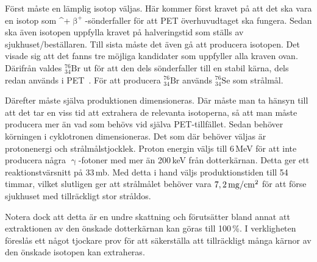 \documentclass[11pt,a4paper, german, english, swedish
]{article}
\newcommand{\BP}{\ifmmode\upbeta^{+}\else$\upbeta^{\!+}$\fi}
\newcommand{\G}{\ifmmode\upgamma\else$\upgamma$\fi}
\begin{document}
Först måste en lämplig isotop väljas. Här kommer först kravet på att det ska vara en isotop som \BP-sönderfaller för att PET överhuvudtaget ska fungera. Sedan ska även isotopen uppfylla kravet på halveringstid som ställs av sjukhuset/beställaren. Till sista måste det även gå att producera isotopen. Det visade sig att det fanns tre möjliga kandidater som uppfyller alla kraven ovan. Därifrån valdes $^{76}_{34}\mathrm{Br}$ ut för att den dels sönderfaller till en stabil kärna, dels redan används i PET~\cite{Lapi_PET,Valette_etal1993,Lovqvist_etal1997,Ribeiro_etal1999}. För att producera $^{76}_{34}\mathrm{Br}$ används $^{76}_{34}\mathrm{Se}$ som strålmål.

Därefter måste själva produktionen dimensioneras. Där måste man ta hänsyn till att det tar en viss tid att extrahera de relevanta isotoperna, så att man måste producera mer än vad som behövs vid själva PET-tillfället. Sedan behöver körningen i cyklotronen dimensioneras. Det som där behöver väljas är protonenergi och strålmålstjocklek. Proton energin väljs till 6\,MeV för att inte producera några \G-fotoner med mer än 200\,keV från dotterkärnan. Detta ger ett reaktionstvärsnitt på 33\,mb. Med detta i hand väljs produktionstiden till 54\,timmar, vilket slutligen ger att strålmålet behöver vara $\unit[7,2]{mg/cm^2}$ för att förse sjukhuset med tillräckligt stor stråldos. 

Notera dock att detta är en undre skattning och förutsätter bland annat att extraktionen av den önskade dotterkärnan kan göras till 100\,\%. I verkligheten föreslås ett något tjockare prov för att säkerställa att tillräckligt många kärnor av den önskade isotopen kan extraheras. 






\end{document}
